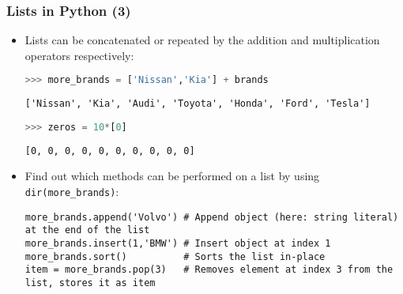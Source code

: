   \begin{frame}[fragile]
    \frametitle{Lists in Python (3)}
    \begin{itemize}
      \item Lists can be concatenated or repeated by the addition and multiplication operators respectively: 
      \begin{lstlisting}[language=Python,numbers=none]
>>> more_brands = ['Nissan','Kia'] + brands
      \end{lstlisting}
      \begin{lstlisting}[style=PyOutput]
['Nissan', 'Kia', 'Audi', 'Toyota', 'Honda', 'Ford', 'Tesla']
      \end{lstlisting}
      \begin{lstlisting}[language=Python,numbers=none]
>>> zeros = 10*[0]
      \end{lstlisting}
      \begin{lstlisting}[style=PyOutput]
[0, 0, 0, 0, 0, 0, 0, 0, 0, 0]
      \end{lstlisting}
      \item Find out which methods can be performed on a list by using \lstinline|dir(more_brands)|:
      \begin{lstlisting}
more_brands.append('Volvo') # Append object (here: string literal) at the end of the list 
more_brands.insert(1,'BMW') # Insert object at index 1
more_brands.sort()          # Sorts the list in-place
item = more_brands.pop(3)   # Removes element at index 3 from the list, stores it as item
      \end{lstlisting}
    \end{itemize}
\end{frame}
 
